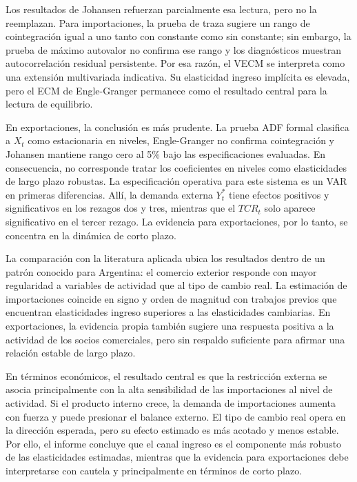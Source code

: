 \documentclass[11pt,a4paper]{article}
\begin{document}
	Los resultados de Johansen refuerzan parcialmente esa lectura, pero no la
	reemplazan. Para importaciones, la prueba de traza sugiere un rango de
	cointegración igual a uno tanto con constante como sin constante; sin embargo,
	la prueba de máximo autovalor no confirma ese rango y los diagnósticos muestran
	autocorrelación residual persistente. Por esa razón, el VECM se interpreta como
	una extensión multivariada indicativa. Su elasticidad ingreso implícita es
	elevada, pero el ECM de Engle-Granger permanece como el resultado central para
	la lectura de equilibrio.
	
	En exportaciones, la conclusión es más prudente. La prueba ADF formal clasifica
	a \(X_t\) como estacionaria en niveles, Engle-Granger no confirma
	cointegración y Johansen mantiene rango cero al 5\% bajo las especificaciones
	evaluadas. En consecuencia, no corresponde tratar los coeficientes en niveles
	como elasticidades de largo plazo robustas. La especificación operativa para
	este sistema es un VAR en primeras diferencias. Allí, la demanda externa
	\(Y_t^*\) tiene efectos positivos y significativos en los rezagos dos y tres,
	mientras que el \(TCR_t\) solo aparece significativo en el tercer rezago. La
	evidencia para exportaciones, por lo tanto, se concentra en la dinámica de
	corto plazo.
	
	La comparación con la literatura aplicada ubica los resultados dentro de un
	patrón conocido para Argentina: el comercio exterior responde con mayor
	regularidad a variables de actividad que al tipo de cambio real. La estimación
	de importaciones coincide en signo y orden de magnitud con trabajos previos que
	encuentran elasticidades ingreso superiores a las elasticidades cambiarias. En
	exportaciones, la evidencia propia también sugiere una respuesta positiva a la
	actividad de los socios comerciales, pero sin respaldo suficiente para afirmar
	una relación estable de largo plazo.
	
	En términos económicos, el resultado central es que la restricción externa se
	asocia principalmente con la alta sensibilidad de las importaciones al nivel de
	actividad. Si el producto interno crece, la demanda de importaciones aumenta
	con fuerza y puede presionar el balance externo. El tipo de cambio real opera
	en la dirección esperada, pero su efecto estimado es más acotado y menos
	estable. Por ello, el informe concluye que el canal ingreso es el componente
	más robusto de las elasticidades estimadas, mientras que la evidencia para
	exportaciones debe interpretarse con cautela y principalmente en términos de
	corto plazo.
	
\end{document}
